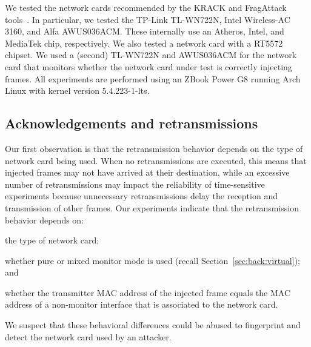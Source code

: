 \documentclass[sigconf]{acmart}
\newcommand{\red}[1]{\textcolor{red}{#1}}
\begin{document}
We tested the network cards recommended by the KRACK and FragAttack tools~\cite{vanhoef-ccs2017,vanhoef-usenix2021-fragattacks}.
In particular, we tested the TP-Link TL-WN722N, Intel Wireless-AC 3160, and Alfa AWUS036ACM. %
These internally use an Atheros, Intel, and MediaTek chip, respectively.
We also tested a network card with a RT5572 chipset.
We used a (second) TL-WN722N and AWUS036ACM for the network card that monitors whether the network card under test is correctly injecting frames.
All experiments are performed using an ZBook Power G8 running Arch Linux with kernel version 5.4.223-1-lts.


\subsection{Acknowledgements and retransmissions}
\label{sec:problems:acks}

Our first observation is that the retransmission behavior depends on the type of network card being used.
When no retransmissions are executed, this means that injected frames may not have arrived at their destination, while an excessive number of retransmissions may impact the reliability of time-sensitive experiments because unnecessary retransmissions delay the reception and transmission of other frames.
Our experiments indicate that the retransmission behavior depends on:
\begin{enumerate*}
    \item the type of network card;
    \item whether pure or mixed monitor mode is used (recall Section~\ref{sec:back:virtual}); and
    \item whether the transmitter MAC address of the injected frame equals the MAC address of a non-monitor interface
    that is associated to the network card.
\end{enumerate*}
%
We suspect that these behavioral differences could be abused to fingerprint and detect the network card used by an attacker.
\end{document}

